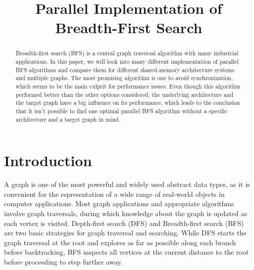 \documentclass[letterpaper]{article}
\title{Parallel Implementation of Breadth-First Search} %
\begin{document}
	\maketitle

	\begin{abstract} %
		 

		Breadth-first search (BFS) is a central graph traversal algorithm with many industrial applications.
		In this paper, we will look into many different implementation of parallel BFS algorithms and compare them for different shared-memory architecture systems and multiple graphs.
		The most promising algorithm is one to avoid synchronization, which seems to be the main culprit for performance issues.
		Even though this algorithm performed better than the other options considered, the underlying architecture and the target graph have a big influence on its performance, which leads to the conclusion that it isn't possible to find one optimal parallel BFS algorithm without a specific architecture and a target graph in mind. %
	\end{abstract}

	\section{Introduction}\label{sec:intro} %
		A graph is one of the most powerful and widely used abstract data types, as it is convenient for the representation of a wide range of real-world objects in computer applications.
		Most graph applications and appropriate algorithms involve graph traversals, during which knowledge about the graph is updated as each vertex is visited. 
		Depth-first search (DFS) and Breadth-first search (BFS) are two basic strategies for graph traversal and searching.
		While DFS starts the graph traversal at the root and explores as far as possible along each branch before backtracking, BFS inspects all vertices at the current distance to the root before proceeding to step further away. %
				
\end{document}

